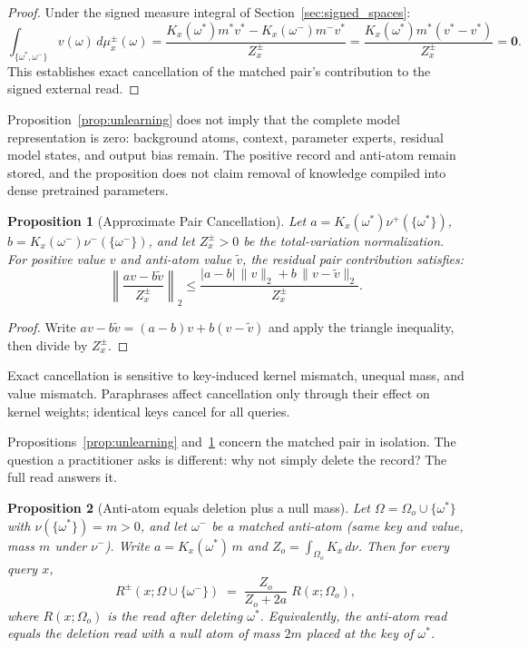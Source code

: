 \documentclass[preprint,12pt]{elsarticle}
\newtheorem{proposition}{Proposition}
\newcommand{\Om}{\Omega}
\newif\ifmarkchanges
\newcommand{\rev}[1]{\ifmarkchanges{\color{blue}#1}\else#1\fi}
\begin{document}
\begin{proof}
Under the signed measure integral of Section~\ref{sec:signed_spaces}:
\[
  \int_{\{\omega^*, \omega^-\}} v(\omega)\, d\mu_x^{\pm}(\omega) = \frac{K_x(\omega^*) m^* v^* - K_x(\omega^-) m^- v^*}{Z_x^{\pm}} = \frac{K_x(\omega^*) m^* (v^* - v^*)}{Z_x^{\pm}} = \mathbf{0}.
\]
This establishes exact cancellation of the matched pair's contribution to the signed external read. \qedhere
\end{proof}

Proposition~\ref{prop:unlearning} does not imply that the complete model representation is zero: background atoms, context, parameter experts, residual model states, and output bias remain. The positive record and anti-atom remain stored, and the proposition does not claim removal of knowledge compiled into dense pretrained parameters.

\begin{proposition}[Approximate Pair Cancellation]
\label{prop:approximate_cancellation}
Let $a=K_x(\omega^*)\nu^+(\{\omega^*\})$, $b=K_x(\omega^-)\nu^-(\{\omega^-\})$, and let $Z_x^{\pm}>0$ be the total-variation normalization. For positive value $v$ and anti-atom value $\tilde v$, the residual pair contribution satisfies:
\[
  \left\|\frac{a v-b\tilde v}{Z_x^{\pm}}\right\|_2
  \le \frac{|a-b|\,\|v\|_2+b\,\|v-\tilde v\|_2}{Z_x^{\pm}}.
\]
\end{proposition}

\begin{proof}
Write $a v-b\tilde v=(a-b)v+b(v-\tilde v)$ and apply the triangle inequality, then divide by $Z_x^{\pm}$. \qedhere
\end{proof}

Exact cancellation is sensitive to key-induced kernel mismatch, unequal mass, and value mismatch. Paraphrases affect cancellation only through their effect on kernel weights; identical keys cancel for all queries.

\rev{Propositions~\ref{prop:unlearning} and~\ref{prop:approximate_cancellation} concern the matched pair in isolation. The question a practitioner asks is different: why not simply delete the record? The full read answers it.}

\begin{proposition}[Anti-atom equals deletion plus a null mass]
\label{prop:anti_vs_delete}
\rev{Let $\Om=\Om_o\cup\{\omega^*\}$ with $\nu(\{\omega^*\})=m>0$, and let $\omega^-$ be a matched anti-atom (same key and value, mass $m$ under $\nu^-$). Write $a=K_x(\omega^*)\,m$ and $Z_o=\int_{\Om_o}K_x\,d\nu$. Then for every query $x$,
\[
  R^{\pm}(x;\Om\cup\{\omega^-\}) \;=\; \frac{Z_o}{Z_o+2a}\;R(x;\Om_o),
\]
where $R(x;\Om_o)$ is the read after deleting $\omega^*$. Equivalently, the anti-atom read equals the deletion read with a null atom of mass $2m$ placed at the key of $\omega^*$.}
\end{proposition}
\end{document}
